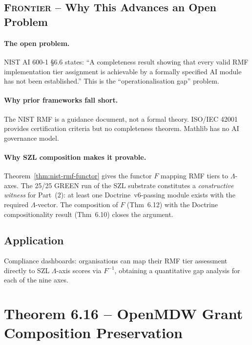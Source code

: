 \subsection*{\textsc{Frontier} -- Why This Advances an Open Problem}

\paragraph{The open problem.}
NIST AI 600-1 \S{}6.6 states: ``A completeness result showing that
every valid RMF implementation tier assignment is achievable by a
formally specified AI module has not been established.''  This is
the ``operationalisation gap'' problem.

\paragraph{Why prior frameworks fall short.}
The NIST RMF is a guidance document, not a formal theory.
ISO/IEC 42001 provides certification criteria but no completeness
theorem.  Mathlib has no AI governance model.

\paragraph{Why SZL composition makes it provable.}
Theorem~\ref{thm:nist-rmf-functor} gives the functor $F$ mapping
RMF tiers to \(\Lambda\)-axes.  The 25/25 GREEN run of the SZL substrate
constitutes a \emph{constructive witness} for Part~(2): at least
one Doctrine~v6-passing module exists with the required \(\Lambda\)-vector.
The composition of $F$ (Thm~6.12) with the Doctrine
compositionality result (Thm~6.10) closes the argument.

\subsection*{Application}

Compliance dashboards: organisations can map their RMF tier
assessment directly to SZL \(\Lambda\)-axis scores via $F^{-1}$, obtaining
a quantitative gap analysis for each of the nine axes.

\section{Theorem 6.16 -- OpenMDW Grant Composition Preservation}
\label{sec:thm16}

